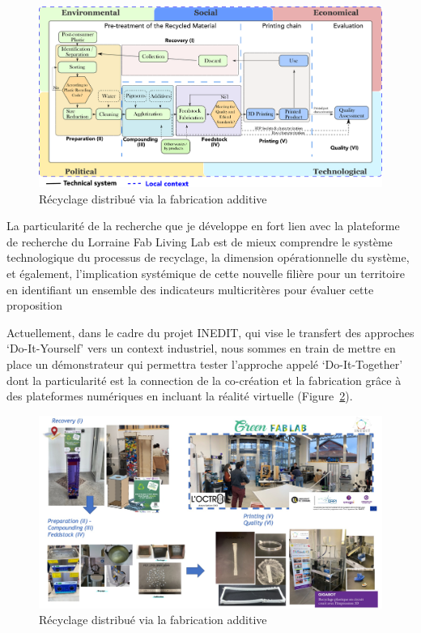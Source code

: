 \documentclass[
  11pt,
]{article}
\begin{document}
\begin{figure}[H]

{\centering \includegraphics{Figures/SDRAM-00.pdf}

}

\caption{\label{fig-sdram}Récyclage distribué via la fabrication
additive}

\end{figure}

La particularité de la recherche que je développe en fort lien avec la
plateforme de recherche du Lorraine Fab Living Lab est de mieux
comprendre le système technologique du processus de recyclage, la
dimension opérationnelle du système, et également, l'implication
systémique de cette nouvelle filière pour un territoire en identifiant
un ensemble des indicateurs multicritères pour évaluer cette proposition

Actuellement, dans le cadre du projet INEDIT, qui vise le transfert des
approches `Do-It-Yourself' vers un context industriel, nous sommes en
train de mettre en place un démonstrateur qui permettra tester
l'approche appelé `Do-It-Together' dont la particularité est la
connection de la co-création et la fabrication grâce à des plateformes
numériques en incluant la réalité virtuelle
(Figure~\ref{fig-DRAM-INEDIT}).

\begin{figure}[H]

{\centering \includegraphics{Figures/INEDIT.jpg}

}

\caption{\label{fig-DRAM-INEDIT}Récyclage distribué via la fabrication
additive}

\end{figure}
\end{document}

